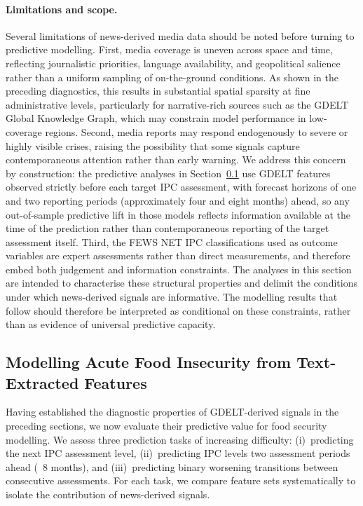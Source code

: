 \documentclass{article}
\begin{document}
\paragraph{Limitations and scope.}
Several limitations of news-derived media data should be noted before turning to predictive modelling. First, media coverage is uneven across space and time, reflecting journalistic priorities, language availability, and geopolitical salience rather than a uniform sampling of on-the-ground conditions. As shown in the preceding diagnostics, this results in substantial spatial sparsity at fine administrative levels, particularly for narrative-rich sources such as the GDELT Global Knowledge Graph, which may constrain model performance in low-coverage regions. Second, media reports may respond endogenously to severe or highly visible crises, raising the possibility that some signals capture contemporaneous attention rather than early warning. We address this concern by construction: the predictive analyses in Section~\ref{sec:modelling_results} use GDELT features observed strictly before each target IPC assessment, with forecast horizons of one and two reporting periods (approximately four and eight months) ahead, so any out-of-sample predictive lift in those models reflects information available at the time of the prediction rather than contemporaneous reporting of the target assessment itself. Third, the FEWS NET IPC classifications used as outcome variables are expert assessments rather than direct measurements, and therefore embed both judgement and information constraints. The analyses in this section are intended to characterise these structural properties and delimit the conditions under which news-derived signals are informative. The modelling results that follow should therefore be interpreted as conditional on these constraints, rather than as evidence of universal predictive capacity.

\subsection{Modelling Acute Food Insecurity from Text-Extracted Features}
\label{sec:modelling_results}

Having established the diagnostic properties of GDELT-derived signals in the preceding sections, we now evaluate their predictive value for food security modelling. We assess three prediction tasks of increasing difficulty: (i)~predicting the next IPC assessment level, (ii)~predicting IPC levels two assessment periods ahead (~8 months), and (iii)~predicting binary worsening transitions between consecutive assessments. For each task, we compare feature sets systematically to isolate the contribution of news-derived signals.
\end{document}
